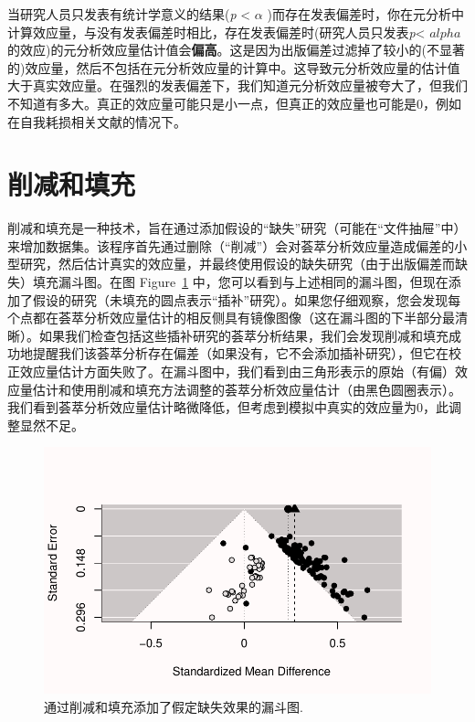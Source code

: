 \documentclass[
  letterpaper,
  DIV=11,
  numbers=noendperiod]{scrreprt}
\begin{document}
当研究人员只发表有统计学意义的结果(\emph{p} \textless{} \(\alpha\)
)而存在发表偏差时，你在元分析中计算效应量，与没有发表偏差时相比，存在发表偏差时(研究人员只发表\emph{p}\textless{}
\(alpha\)的效应)的元分析效应量估计值会\textbf{偏高}。这是因为出版偏差过滤掉了较小的(不显著的)效应量，然后不包括在元分析效应量的计算中。这导致元分析效应量的估计值大于真实效应量。在强烈的发表偏差下，我们知道元分析效应量被夸大了，但我们不知道有多大。真正的效应量可能只是小一点，但真正的效应量也可能是0，例如在自我耗损相关文献的情况下。

\hypertarget{ux524aux51cfux548cux586bux5145}{%
\section{削减和填充}\label{ux524aux51cfux548cux586bux5145}}

削减和填充是一种技术，旨在通过添加假设的``缺失''研究（可能在``文件抽屉''中）来增加数据集。该程序首先通过删除（``削减''）会对荟萃分析效应量造成偏差的小型研究，然后估计真实的效应量，并最终使用假设的缺失研究（由于出版偏差而缺失）填充漏斗图。在图
Figure~\ref{fig-trimfill1}
中，您可以看到与上述相同的漏斗图，但现在添加了假设的研究（未填充的圆点表示``插补''研究）。如果您仔细观察，您会发现每个点都在荟萃分析效应量估计的相反侧具有镜像图像（这在漏斗图的下半部分最清晰）。如果我们检查包括这些插补研究的荟萃分析结果，我们会发现削减和填充成功地提醒我们该荟萃分析存在偏差（如果没有，它不会添加插补研究），但它在校正效应量估计方面失败了。在漏斗图中，我们看到由三角形表示的原始（有偏）效应量估计和使用削减和填充方法调整的荟萃分析效应量估计（由黑色圆圈表示）。我们看到荟萃分析效应量估计略微降低，但考虑到模拟中真实的效应量为0，此调整显然不足。

\begin{figure}

{\centering \includegraphics[width=1\textwidth,height=\textheight]{12-bias_files/figure-pdf/fig-trimfill1-1.pdf}

}

\caption{\label{fig-trimfill1}通过削减和填充添加了假定缺失效果的漏斗图.}

\end{figure}
\end{document}
